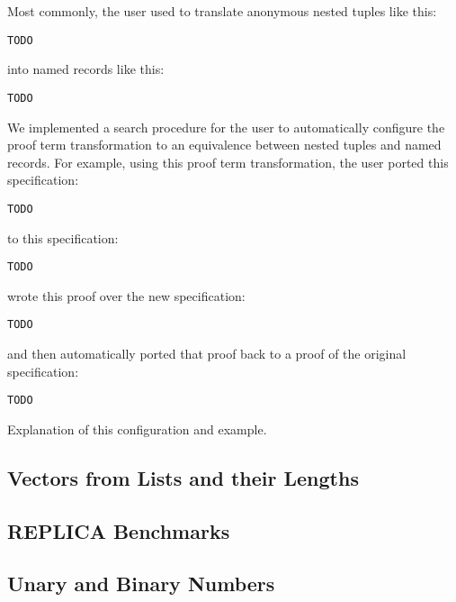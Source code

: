 Most commonly, the user used \toolname to translate anonymous nested tuples like this:

\begin{lstlisting}
TODO
\end{lstlisting}
into named records like this:

\begin{lstlisting}
TODO
\end{lstlisting}
We implemented a search procedure for the user to automatically configure the proof term transformation to an equivalence
between nested tuples and named records.
For example, using this proof term transformation, the user ported this specification:

\begin{lstlisting}
TODO
\end{lstlisting}
to this specification:

\begin{lstlisting}
TODO
\end{lstlisting}
wrote this proof over the new specification:

\begin{lstlisting}
TODO
\end{lstlisting}
and then automatically ported that proof back to a proof of the original specification:

\begin{lstlisting}
TODO
\end{lstlisting}

Explanation of this configuration and example.

\subsection{Vectors from Lists and their Lengths}
\label{sec:dep}

\subsection{REPLICA Benchmarks}
\label{sec:replica}

\subsection{Unary and Binary Numbers}
\label{sec:bin}



